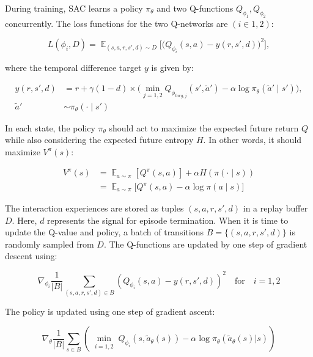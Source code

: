 During training, SAC learns a policy $\pi_{\theta}$ and two Q-functions
$Q_{\phi_1} , Q_{\phi_2}$ concurrently. The loss functions for the two Q-networks are
$(i \in {1, 2})$:

\begin{equation}
  L(\phi_i,D) = \displaystyle
  \mathop{\mathbb{E}}_{(s,a,r,s',d)\sim{D}}\bigg[\bigg(Q_{\phi_i}(s,a)-y(r,s',d)\bigg)^2\bigg],
\end{equation}

where the temporal difference target \(y\) is given by:

\begin{align}
  y(r,s',d) &= r + \gamma(1-d) \times \nonumber\bigg(\displaystyle
  \mathop{\min}_{j=1,2}Q_{\phi_{targ,j}}(s',\tilde{a}')-\alpha\log
  {\pi_\theta}(\tilde{a}'\mid{s}')\bigg), \\
  \tilde{a}'&\sim{\pi_\theta}(\cdot\mid{s'})
\end{align}

In each state, the policy \(\pi_\theta\) should act to maximize the expected
future return \(Q\) while also considering the expected future entropy \(H\). In other
words, it should maximize \(V^\pi(s)\):

\begin{align}
 V^\pi(s) &= {\displaystyle \mathop{\mathbb{E}}_{a\sim\pi}[Q^\pi(s,a)]} +
 \alpha{H(\pi(\cdot\mid{s}))} \\
 &= {\displaystyle \mathop{\mathbb{E}}_{a\sim\pi}[Q^\pi(s,a)} -
 \alpha{\log {\pi(a\mid{s})]}}
\end{align}

The interaction experiences are stored as tuples \((s, a, r, s', d)\) in a replay buffer \(\textit{D}\). Here, \(d\) represents the signal for episode termination. When it is time to update the Q-value and policy, a batch of transitions \(\textit{B} = \{(s, a, r, s', d)\}\) is randomly sampled from \(\textit{D}\). The Q-functions are updated by one step of gradient descent using:

\begin{equation}
\nabla_{\phi_i} \frac{1}{|\textit{B}|} \sum_{(s, a, r, s', d) \in \textit{B}} \left(Q_{\phi_i}(s, a) - y(r, s', d)\right)^2 \quad \text{for} \quad i=1,2
\end{equation}

The policy is updated using one step of gradient ascent:

\begin{equation}
\nabla_{\theta} \frac{1}{|\textit{B}|} \sum_{s \in \textit{B}}\left(\min\limits_{\substack{i=1,2}}Q_{\phi_i}(s,\widetilde{a}_{\theta}(s)) - \alpha \log\pi_{\theta}(\widetilde{a}_{\theta}(s)|s)\right)
\end{equation}

